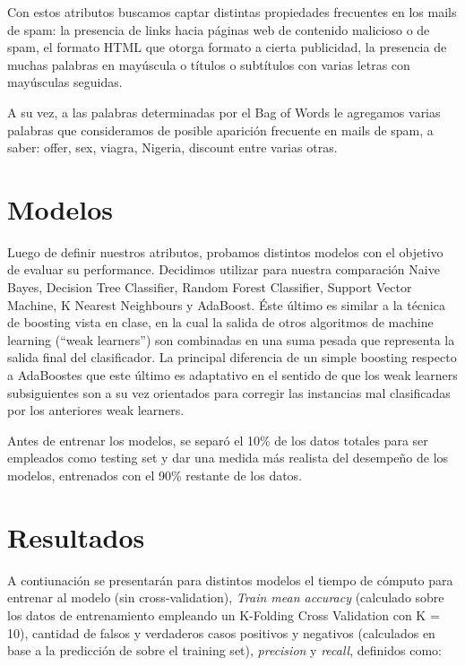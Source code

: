 \documentclass[10pt,a4paper]{article}
\begin{document}
Con estos atributos buscamos captar distintas propiedades frecuentes en los mails de spam: la presencia de links hacia páginas web de contenido malicioso o de spam, el formato HTML que otorga formato a cierta publicidad, la presencia de muchas palabras en mayúscula o títulos o subtítulos con varias letras con mayúsculas seguidas.

A su vez, a las palabras determinadas por el Bag of Words le agregamos varias palabras que consideramos de posible aparición frecuente en mails de spam, a saber: offer, sex, viagra, Nigeria, discount entre varias otras.

\section{Modelos}

Luego de definir nuestros atributos, probamos distintos modelos con el objetivo de evaluar su performance. Decidimos utilizar para nuestra comparación Naive Bayes, Decision Tree Classifier, Random Forest Classifier, Support Vector Machine, K Nearest Neighbours y AdaBoost. Éste último es similar a la técnica de boosting vista en clase, en la cual la salida de otros algoritmos de machine learning (``weak learners'') son combinadas en una suma pesada que representa la salida final del clasificador. La principal diferencia de un simple boosting respecto a AdaBoostes que este último es adaptativo en el sentido de que los weak learners subsiguientes son a su vez orientados para corregir las instancias mal clasificadas por los anteriores weak learners.

Antes de entrenar los modelos, se separó el 10\% de los datos totales para ser empleados como testing set y dar una medida más realista del desempeño de los modelos, entrenados con el 90\% restante de los datos.


\section{Resultados}

A contiunación se presentarán para distintos modelos el tiempo de cómputo para entrenar al modelo (sin cross-validation), \emph{Train mean accuracy} (calculado sobre los datos de entrenamiento empleando un K-Folding Cross Validation con K = 10), cantidad de falsos y verdaderos casos positivos y negativos (calculados en base a la predicción de sobre el training set), \textit{precision} y \textit{recall}, definidos como:
\end{document}
